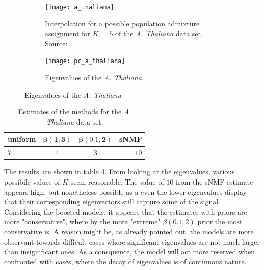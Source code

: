 \documentclass[a4paper, 11pt]{article}
\begin{document}
\begin{figure}
\centering
\begin{subfigure}
\centering
\texttt{[image: a\_thaliana]}
\caption{Interpolation for a possible population admixture assignment for $K\,= 5$ of the \textit{A. Thaliana} data set. Source: \cite{franccois2016running}}
\end{subfigure}
\begin{subfigure}
\centering
\texttt{[image: pc\_a\_thaliana]}
\caption{Eigenvalues of the \textit{A. Thaliana}}
\end{subfigure}
\end{figure}



\begin{table}[h!]
  \begin{center}
    \label{tab:table3}
    \begin{tabular}{l|c|c|r} %
      \textbf{uniform} & $\mathbf{\beta(1, 3)}$ & $\mathbf{\beta(0.1,2)}$  & \textbf{sNMF}\\
      \hline
      $7$ & $4$ & $3$ & $10$\\
    \end{tabular}
    \caption{Estimates of the methods for the \textit{A. Thaliana} data set.}
  \end{center}
\end{table}

The results are shown in table 4. From looking at the eigenvalues, various possibile values of $K$ seem reasonable. The value of $10$ from the sNMF estimate appears high, but nonetheless possible as a even the lower eigenvalues display that their corresponding eigenvectors still capture some of the signal. \\
Considering the boosted models, it appears that the estimates with priors are more "conservative", where by the more "extreme" $\beta(0.1,2)$ prior the most conservative is. A reason might be, as already pointed out, the models are more observant towards difficult cases where significant eigenvalues are not much larger than insignificant ones. As a consquence, the model will act more reserved when confronted with cases, where the decay of eigenvalues is of continuous nature.
\end{document}
